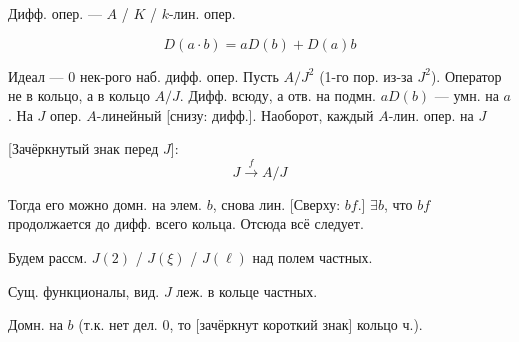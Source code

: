 \par\noindent\begin{minipage}{\linewidth}
Дифф. опер. — $A$ / $K$ / $k$-лин. опер.
\end{minipage}\par
\par\noindent\begin{minipage}{\linewidth}
\begin{equation*}
D(a\cdot b)=aD(b)+D(a)b
\end{equation*}
\end{minipage}\par
Идеал — 0 нек-рого наб. дифф. опер.
Пусть $A/J^2$ (1-го пор. из-за $J^2$).
Оператор не в кольцо, а в кольцо $A/J$.
Дифф. всюду, а отв. на подмн.
$aD(b)$ — умн. на $a$.
На $J$ опер. $A$-линейный [снизу: дифф.].
Наоборот, каждый $A$-лин. опер. на $J$
\par\noindent\begin{minipage}{\linewidth}
[Зачёркнутый знак перед $J$]:
\begin{equation*}
J\overset{f}{\longrightarrow}A/J
\end{equation*}
\end{minipage}\par
Тогда его можно домн. на элем. $b$, снова лин.
[Сверху: $bf$.]
$\exists b$, что $bf$ продолжается до дифф. всего кольца.
Отсюда всё следует.
\par\noindent\begin{minipage}{\linewidth}
Будем рассм. $J(2)$ / $J(\xi)$ / $J(\ell)$ над полем частных.
\end{minipage}\par
Сущ. функционалы, вид. $J$ леж. в кольце частных.
\par\noindent\begin{minipage}{\linewidth}
Домн. на $b$ (т.к. нет дел. 0, то [зачёркнут короткий знак] кольцо ч.).
\end{minipage}\par
